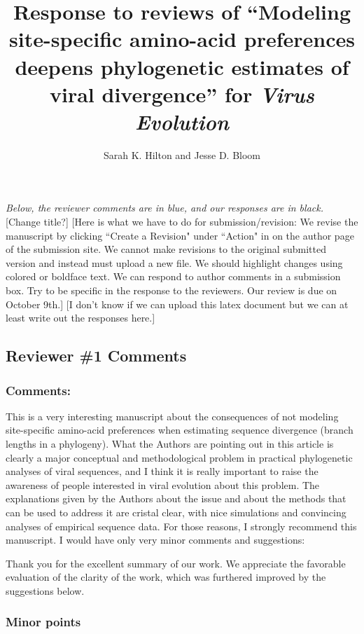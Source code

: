 \documentclass[11pt, oneside]{article}   	%
\title{Response to reviews of ``Modeling site-specific amino-acid preferences deepens phylogenetic estimates of viral divergence'' for \textit{Virus Evolution}}
\author{Sarah K. Hilton and Jesse D. Bloom}
\newcommand{\response}[1]{{\color{black}#1}}
\newcommand\skhcomment[1]{{\color{magenta}[#1]}}
\begin{document}
\maketitle

\emph{Below, the reviewer comments {\color{blue} are in blue}, and our responses are in black.}
\skhcomment{Change title?}
\skhcomment{Here is what we have to do for submission/revision: We revise the manuscript by clicking ``Create a Revision" under ``Action" in on the author page of the submission site. We cannot make revisions to the original submitted version and instead must upload a new file. We should highlight changes using colored or boldface text. We can respond to author comments in a submission box. Try to be specific in the response to the reviewers. Our review is due on October 9th.}
\skhcomment{I don't know if we can upload this latex document but we can at least write out the responses here.}

\color{blue}

\subsection*{Reviewer \#1 Comments}

\subsubsection*{Comments:} 
This is a very interesting manuscript about the consequences of not modeling site-specific amino-acid preferences when estimating sequence divergence (branch lengths in a phylogeny). 
What the Authors are pointing out in this article is clearly a major conceptual and methodological problem in practical phylogenetic analyses of viral sequences, and I think it is really important to raise the awareness of people interested in viral evolution about this problem. 
The explanations given by the Authors about the issue and about the methods that can be used to address it are cristal clear, with nice simulations and convincing analyses of empirical sequence data. 
For those reasons, I strongly recommend this manuscript. 
I would have only very minor comments and suggestions: 

\response{Thank you for the excellent summary of our work. 
We appreciate the favorable evaluation of the clarity of the work, which was furthered improved by the suggestions below.}

\subsubsection*{Minor points} 
\end{document}
